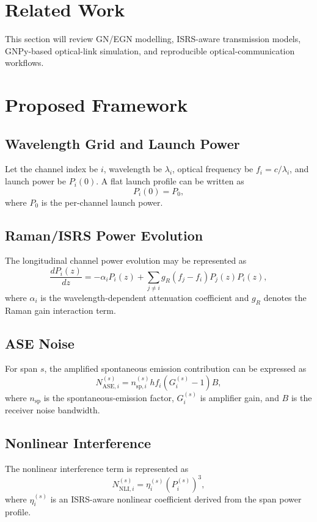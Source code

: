 \documentclass[twocolumn]{article}
\begin{document}
\section{Related Work}
This section will review GN/EGN modelling, ISRS-aware transmission models, GNPy-based optical-link simulation, and reproducible optical-communication workflows.

\section{Proposed Framework}

\subsection{Wavelength Grid and Launch Power}
Let the channel index be \(i\), wavelength be \(\lambda_i\), optical frequency be \(f_i=c/\lambda_i\), and launch power be \(P_i(0)\). A flat launch profile can be written as
\begin{equation}
P_i(0)=P_0,
\end{equation}
where \(P_0\) is the per-channel launch power.

\subsection{Raman/ISRS Power Evolution}
The longitudinal channel power evolution may be represented as
\begin{equation}
\frac{dP_i(z)}{dz}
=
-\alpha_i P_i(z)
+
\sum_{j \neq i} g_R(f_j-f_i) P_j(z)P_i(z),
\end{equation}
where \(\alpha_i\) is the wavelength-dependent attenuation coefficient and \(g_R\) denotes the Raman gain interaction term.

\subsection{ASE Noise}
For span \(s\), the amplified spontaneous emission contribution can be expressed as
\begin{equation}
N_{\mathrm{ASE},i}^{(s)}
=
n_{\mathrm{sp},i}^{(s)} h f_i
\left(G_i^{(s)}-1\right)B,
\end{equation}
where \(n_{\mathrm{sp}}\) is the spontaneous-emission factor, \(G_i^{(s)}\) is amplifier gain, and \(B\) is the receiver noise bandwidth.

\subsection{Nonlinear Interference}
The nonlinear interference term is represented as
\begin{equation}
N_{\mathrm{NLI},i}^{(s)}
=
\eta_i^{(s)} \left(P_i^{(s)}\right)^3,
\end{equation}
where \(\eta_i^{(s)}\) is an ISRS-aware nonlinear coefficient derived from the span power profile.
\end{document}
